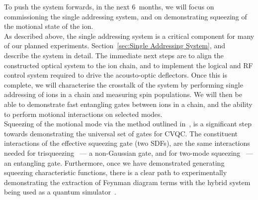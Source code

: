     To push the system forwards, in the next 6~months, we will focus on
    commissioning the single addressing system, and on demonstrating squeezing of
    the motional state of the ion.\\
    As described above, the single addressing system is a critical component for
    many of our planned experiments. Section~\ref{sec:Single Addressing System},
    and~\cite{oevergaard2024limiting} describe the system in detail. The 
    immediate next steps are to align the constructed optical system to the ion
    chain, and to implement the logical and RF control system required to drive
    the acousto-optic deflectors. Once this is complete, we will characterise
    the crosstalk of the system by performing single addressing of ions in a
    chain and measuring spin populations. We will then be able to demonstrate
    fast entangling gates between ions in a chain, and the ability to perform
    motional interactions on selected modes.\\
    Squeezing of the motional mode via the method outlined
    in~\cite{sutherland2021universal}, is a significant step towards
    demonstrating the universal set of gates for CVQC. 
    The constituent interactions of the effective squeezing gate (two SDFs), are
    the same interactions needed for trisqueezing~\cite{braunstein1987generalised, bazavan2024squeezing} --- a non-Gaussian gate, and
    for two-mode squeezing~\cite{lvovsky2015squeezed} --- an entangling gate. Furthermore, once we have
    demonstrated generating squeezing characteristic functions, there is a clear
    path to experimentally demonstrating the extraction of Feynman diagram terms
    with the hybrid system being used as a quantum
    simulator~\cite{varona2024towards}.\\
